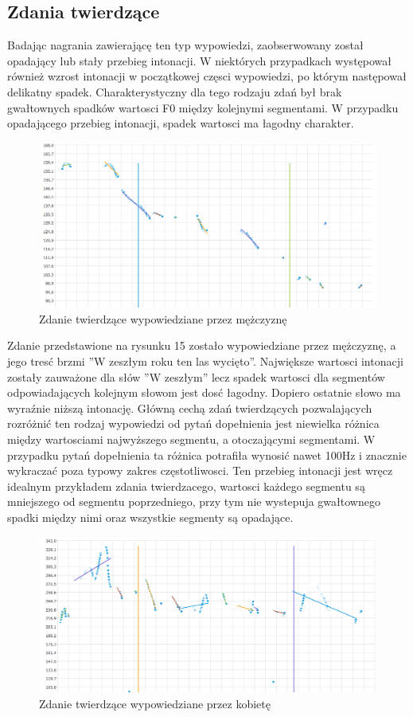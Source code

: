 \documentclass[a4paper,12 pt]{article}
\begin{document}
\subsection{Zdania twierdzące}
Badając nagrania zawierającę ten typ wypowiedzi, zaobserwowany został opadający lub stały przebieg intonacji. W niektórych przypadkach występował również wzrost intonacji w początkowej częsci wypowiedzi, po którym następował delikatny spadek. Charakterystyczny dla tego rodzaju zdań był brak gwałtownych spadków wartosci F0 między kolejnymi segmentami. W przypadku opadającego przebieg intonacji, spadek wartosci ma łagodny charakter.
 \FloatBarrier
\begin{figure}[h]
\centering
\includegraphics[scale=0.7]{twierdzace_walczyc.png}
\caption{Zdanie twierdzące wypowiedziane przez mężczyznę}
\end{figure}
\FloatBarrier
Zdanie przedstawione na rysunku 15 zostało wypowiedziane przez mężczyznę, a jego tresć brzmi ''W zeszłym roku ten las wycięto''. Największe wartosci intonacji zostały zauważone dla słów ''W zeszłym'' lecz spadek wartosci dla segmentów odpowiadających kolejnym słowom jest dosć łagodny. Dopiero ostatnie słowo ma wyraźnie niższą intonację. Główną cechą zdań twierdzących pozwalających rozróżnić ten rodzaj wypowiedzi od pytań dopełnienia jest niewielka różnica między wartosciami najwyższego segmentu, a otoczającymi segmentami. W przypadku pytań dopełnienia ta różnica potrafiła wynosić nawet 100Hz i znacznie wykraczać poza typowy zakres częstotliwosci. Ten przebieg intonacji jest wręcz idealnym przykładem zdania twierdzacego, wartosci każdego segmentu są mniejszego od segmentu poprzedniego, przy tym nie wystepuja gwałtownego spadki między nimi oraz wszystkie segmenty są opadające.
 \FloatBarrier
\begin{figure}[h]
\centering
\includegraphics[scale=0.7]{twierdzace_coraz.png}
\caption{Zdanie twierdzące wypowiedziane przez kobietę}
\end{figure}
\end{document}
